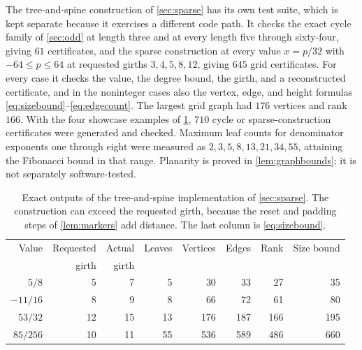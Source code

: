 \documentclass[11pt,a4paper]{article}
\numberwithin{equation}{section}
\theoremstyle{definition}
\theoremstyle{remark}
\begin{document}
The tree-and-spine construction of \cref{sec:sparse} has its own test suite,
which is kept separate because it exercises a different code path. It checks the
exact cycle family of \cref{sec:odd} at length three and at every length five
through sixty-four, giving $61$ certificates, and the sparse construction at
every value $x=p/32$ with $-64\leq p\leq64$ at requested girths $3,4,5,8,12$,
giving $645$ grid certificates. For every case it checks the value, the degree
bound, the girth, and a reconstructed certificate, and in the noninteger cases
also the vertex, edge, and height formulas \eqref{eq:sizebound}--\eqref{eq:edgecount}.
The largest grid graph had $176$ vertices and rank $166$. With the four showcase
examples of \cref{tab:showcase}, $710$ cycle or sparse-construction certificates
were generated and checked. Maximum leaf counts for denominator exponents one
through eight were measured as $2,3,5,8,13,21,34,55$, attaining the Fibonacci
bound in that range. Planarity is proved in \cref{lem:graphbounds}; it is not
separately software-tested.

\begin{table}[htbp]
\centering
\begin{tabular}{@{}rrrrrrrr@{}}
\toprule
Value & Requested & Actual & Leaves & Vertices & Edges & Rank & Size bound\\
 & girth & girth & & & & & \\
\midrule
$5/8$    &5 &7 &5 &30 &33 &27 &35\\
$-11/16$ &8 &9 &8 &66 &72 &61 &80\\
$53/32$  &12&15&13&176&187&166&195\\
$85/256$ &10&11&55&536&589&486&660\\
\bottomrule
\end{tabular}
\caption{Exact outputs of the tree-and-spine implementation of
\cref{sec:sparse}. The construction can exceed the requested girth, because the
reset and padding steps of \cref{lem:markers} add distance. The last column is
\eqref{eq:sizebound}.}
\label{tab:showcase}
\end{table}
\end{document}
